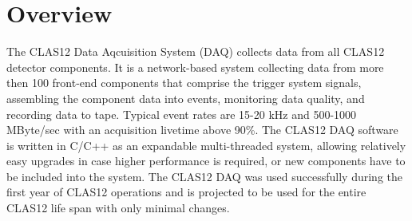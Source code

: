 \section{Overview}

The CLAS12 Data Aqcuisition System (DAQ) collects data from all CLAS12 detector components. It is a network-based system collecting data from more then 100 front-end components that comprise the trigger system signals, assembling the component data into events, monitoring data quality, and recording data to tape. Typical event rates are 15-20 kHz and 500-1000 MByte/sec with an acquisition livetime above 90\%. The CLAS12 DAQ software is written in C/C++ as an expandable multi-threaded system, allowing relatively easy upgrades in case higher performance is required, or new components have to be included into the system. The CLAS12 DAQ was used successfully during the first year of CLAS12 operations and is projected to be used for the entire CLAS12 life span with only minimal changes.


